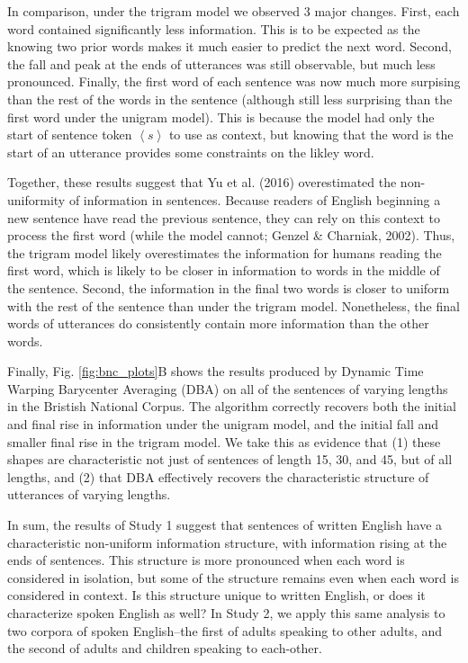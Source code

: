 \documentclass[10pt, letterpaper]{article}
\begin{document}
In comparison, under the trigram model we observed 3 major changes.
First, each word contained significantly less information. This is to be
expected as the knowing two prior words makes it much easier to predict
the next word. Second, the fall and peak at the ends of utterances was
still observable, but much less pronounced. Finally, the first word of
each sentence was now much more surpising than the rest of the words in
the sentence (although still less surprising than the first word under
the unigram model). This is because the model had only the start of
sentence token \(\left<s\right>\) to use as context, but knowing that
the word is the start of an utterance provides some constraints on the
likley word.

Together, these results suggest that Yu et al. (2016) overestimated the
non-uniformity of information in sentences. Because readers of English
beginning a new sentence have read the previous sentence, they can rely
on this context to process the first word (while the model cannot;
Genzel \& Charniak, 2002). Thus, the trigram model likely overestimates
the information for humans reading the first word, which is likely to be
closer in information to words in the middle of the sentence. Second,
the information in the final two words is closer to uniform with the
rest of the sentence than under the trigram model. Nonetheless, the
final words of utterances do consistently contain more information than
the other words.

Finally, Fig. \ref{fig:bnc_plots}B shows the results produced by Dynamic
Time Warping Barycenter Averaging (DBA) on all of the sentences of
varying lengths in the Bristish National Corpus. The algorithm correctly
recovers both the initial and final rise in information under the
unigram model, and the initial fall and smaller final rise in the
trigram model. We take this as evidence that (1) these shapes are
characteristic not just of sentences of length 15, 30, and 45, but of
all lengths, and (2) that DBA effectively recovers the characteristic
structure of utterances of varying lengths.

In sum, the results of Study 1 suggest that sentences of written English
have a characteristic non-uniform information structure, with
information rising at the ends of sentences. This structure is more
pronounced when each word is considered in isolation, but some of the
structure remains even when each word is considered in context. Is this
structure unique to written English, or does it characterize spoken
English as well? In Study 2, we apply this same analysis to two corpora
of spoken English--the first of adults speaking to other adults, and the
second of adults and children speaking to each-other.
\end{document}
